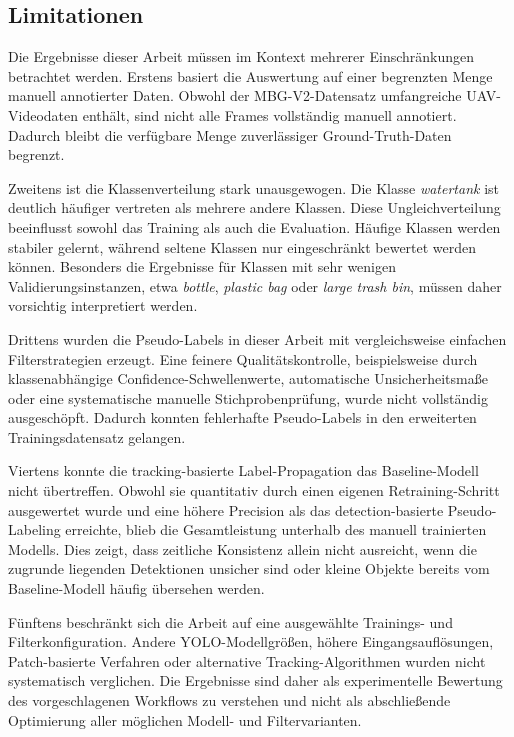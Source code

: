 \subsection{Limitationen}

Die Ergebnisse dieser Arbeit müssen im Kontext mehrerer Einschränkungen
betrachtet werden. Erstens basiert die Auswertung auf einer begrenzten Menge
manuell annotierter Daten. Obwohl der MBG-V2-Datensatz umfangreiche
UAV-Videodaten enthält, sind nicht alle Frames vollständig manuell annotiert.
Dadurch bleibt die verfügbare Menge zuverlässiger Ground-Truth-Daten begrenzt.

Zweitens ist die Klassenverteilung stark unausgewogen. Die Klasse
\textit{watertank} ist deutlich häufiger vertreten als mehrere andere Klassen. Diese
Ungleichverteilung beeinflusst sowohl das Training als auch die Evaluation.
Häufige Klassen werden stabiler gelernt, während seltene Klassen nur eingeschränkt
bewertet werden können. Besonders die Ergebnisse für Klassen mit sehr wenigen
Validierungsinstanzen, etwa \textit{bottle}, \textit{plastic bag} oder
\textit{large trash bin}, müssen daher vorsichtig interpretiert werden.

Drittens wurden die Pseudo-Labels in dieser Arbeit mit vergleichsweise einfachen
Filterstrategien erzeugt. Eine feinere Qualitätskontrolle, beispielsweise durch
klassenabhängige Confidence-Schwellenwerte, automatische Unsicherheitsmaße oder
eine systematische manuelle Stichprobenprüfung, wurde nicht vollständig
ausgeschöpft. Dadurch konnten fehlerhafte Pseudo-Labels in den erweiterten
Trainingsdatensatz gelangen.

Viertens konnte die tracking-basierte Label-Propagation das Baseline-Modell nicht
übertreffen. Obwohl sie quantitativ durch einen eigenen Retraining-Schritt
ausgewertet wurde und eine höhere Precision als das detection-basierte
Pseudo-Labeling erreichte, blieb die Gesamtleistung unterhalb des manuell
trainierten Modells. Dies zeigt, dass zeitliche Konsistenz allein nicht ausreicht,
wenn die zugrunde liegenden Detektionen unsicher sind oder kleine Objekte bereits
vom Baseline-Modell häufig übersehen werden.

Fünftens beschränkt sich die Arbeit auf eine ausgewählte Trainings- und
Filterkonfiguration. Andere YOLO-Modellgrößen, höhere Eingangsauflösungen,
Patch-basierte Verfahren oder alternative Tracking-Algorithmen wurden nicht
systematisch verglichen. Die Ergebnisse sind daher als experimentelle Bewertung
des vorgeschlagenen Workflows zu verstehen und nicht als abschließende
Optimierung aller möglichen Modell- und Filtervarianten.

